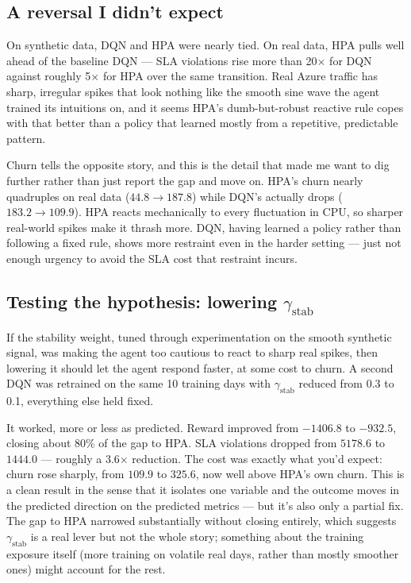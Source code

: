 \documentclass{rapportINPTCLOUD}
\begin{document}
\subsection{A reversal I didn't expect}

On synthetic data, DQN and HPA were nearly tied. On real data, HPA pulls well ahead of the baseline DQN — SLA violations rise more than 20$\times$ for DQN against roughly 5$\times$ for HPA over the same transition. Real Azure traffic has sharp, irregular spikes that look nothing like the smooth sine wave the agent trained its intuitions on, and it seems HPA's dumb-but-robust reactive rule copes with that better than a policy that learned mostly from a repetitive, predictable pattern.

Churn tells the opposite story, and this is the detail that made me want to dig further rather than just report the gap and move on. HPA's churn nearly quadruples on real data ($44.8 \to 187.8$) while DQN's actually drops ($183.2 \to 109.9$). HPA reacts mechanically to every fluctuation in CPU, so sharper real-world spikes make it thrash more. DQN, having learned a policy rather than following a fixed rule, shows more restraint even in the harder setting — just not enough urgency to avoid the SLA cost that restraint incurs.

\subsection{Testing the hypothesis: lowering $\gamma_{\text{stab}}$}
\label{sec:gamma-stab}

If the stability weight, tuned through experimentation on the smooth synthetic signal, was making the agent too cautious to react to sharp real spikes, then lowering it should let the agent respond faster, at some cost to churn. A second DQN was retrained on the same 10 training days with $\gamma_{\text{stab}}$ reduced from 0.3 to 0.1, everything else held fixed.

It worked, more or less as predicted. Reward improved from $-1406.8$ to $-932.5$, closing about 80\% of the gap to HPA. SLA violations dropped from $5178.6$ to $1444.0$ — roughly a 3.6$\times$ reduction. The cost was exactly what you'd expect: churn rose sharply, from $109.9$ to $325.6$, now well above HPA's own churn. This is a clean result in the sense that it isolates one variable and the outcome moves in the predicted direction on the predicted metrics — but it's also only a partial fix. The gap to HPA narrowed substantially without closing entirely, which suggests $\gamma_{\text{stab}}$ is a real lever but not the whole story; something about the training exposure itself (more training on volatile real days, rather than mostly smoother ones) might account for the rest.
\end{document}
